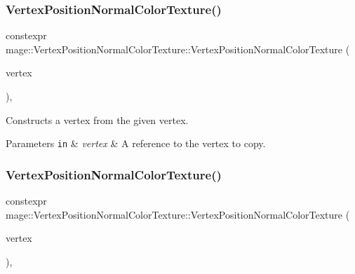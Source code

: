 \subsubsection{\texorpdfstring{Vertex\+Position\+Normal\+Color\+Texture()}{VertexPositionNormalColorTexture()}\hspace{0.1cm}{\footnotesize\ttfamily [3/4]}}
{\footnotesize\ttfamily constexpr mage\+::\+Vertex\+Position\+Normal\+Color\+Texture\+::\+Vertex\+Position\+Normal\+Color\+Texture (\begin{DoxyParamCaption}\item[{const \hyperlink{structmage_1_1_vertex_position_normal_color_texture}{Vertex\+Position\+Normal\+Color\+Texture} \&}]{vertex }\end{DoxyParamCaption})\hspace{0.3cm}{\ttfamily [default]}, {\ttfamily [noexcept]}}

Constructs a vertex from the given vertex.


\begin{DoxyParams}[1]{Parameters}
\mbox{\tt in}  & {\em vertex} & A reference to the vertex to copy. \\
\hline
\end{DoxyParams}
\hypertarget{structmage_1_1_vertex_position_normal_color_texture_ae453b2d23359d907f13a377d03221a0a}{}\label{structmage_1_1_vertex_position_normal_color_texture_ae453b2d23359d907f13a377d03221a0a} 
\subsubsection{\texorpdfstring{Vertex\+Position\+Normal\+Color\+Texture()}{VertexPositionNormalColorTexture()}\hspace{0.1cm}{\footnotesize\ttfamily [4/4]}}
{\footnotesize\ttfamily constexpr mage\+::\+Vertex\+Position\+Normal\+Color\+Texture\+::\+Vertex\+Position\+Normal\+Color\+Texture (\begin{DoxyParamCaption}\item[{\hyperlink{structmage_1_1_vertex_position_normal_color_texture}{Vertex\+Position\+Normal\+Color\+Texture} \&\&}]{vertex }\end{DoxyParamCaption})\hspace{0.3cm}{\ttfamily [default]}, {\ttfamily [noexcept]}}

